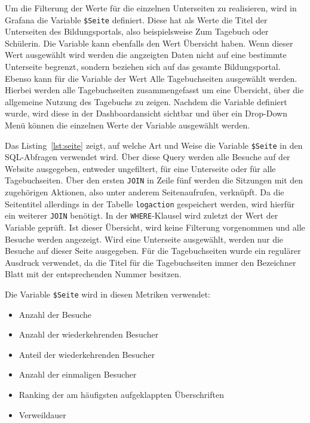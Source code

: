 Um die Filterung der Werte für die einzelnen Unterseiten zu realisieren, wird in Grafana die Variable \texttt{\$Seite} definiert. Diese hat als Werte die Titel der Unterseiten des Bildungsportals, also beispielsweise \glqq Zum Tagebuch\grqq{} oder \glqq Schülerin\grqq{}. Die Variable kann ebenfalls den Wert \glqq Übersicht\grqq{} haben. Wenn dieser Wert ausgewählt wird werden die angzeigten Daten nicht auf eine bestimmte Unterseite begrenzt, sondern beziehen sich auf das gesamte Bildungsportal. Ebenso kann für die Variable der Wert \glqq Alle Tagebuchseiten\grqq{} ausgewählt werden. Hierbei werden alle Tagebuchseiten zusammengefasst um eine Übersicht, über die allgemeine Nutzung des Tagebuchs zu zeigen. Nachdem die Variable definiert wurde, wird diese in der Dashboardansicht sichtbar und über ein Drop-Down Menü können die einzelnen Werte der Variable ausgewählt werden.

\begin{figure}[H]
    \centering
    \begin{minipage}{\textwidth}
        
    \end{minipage}
\end{figure}

Das Listing~\ref{lst:seite} zeigt, auf welche Art und Weise die Variable \texttt{\$Seite} in den SQL-Abfragen verwendet wird. Über diese Query werden alle Besuche auf der Website ausgegeben, entweder ungefiltert, für eine Unterseite oder für alle Tagebuchseiten. Über den ersten \texttt{JOIN} in Zeile fünf werden die Sitzungen mit den zugehörigen Aktionen, also unter anderem Seitenaufrufen, verknüpft. Da die Seitentitel allerdings in der Tabelle \texttt{log\textunderscore action} gespeichert werden, wird hierfür ein weiterer \texttt{JOIN} benötigt. In der {\texttt{WHERE}-Klausel} wird zuletzt der Wert der Variable geprüft. Ist dieser \glqq Übersicht\grqq{}, wird keine Filterung vorgenommen und alle Besuche werden angezeigt. Wird eine Unterseite ausgewählt, werden nur die Besuche auf dieser Seite ausgegeben. Für die Tagebuchseiten wurde ein regulärer Ausdruck verwendet, da die Titel für die Tagebuchseiten immer den Bezeichner \glqq Blatt\grqq{} mit der entsprechenden Nummer besitzen.

Die Variable \texttt{\$Seite} wird in diesen Metriken verwendet: 
\begin{itemize}
    \item Anzahl der Besuche
    \item Anzahl der wiederkehrenden Besucher
    \item Anteil der wiederkehrenden Besucher
    \item Anzahl der einmaligen Besucher
    \item Ranking der am häufigsten aufgeklappten Überschriften
    \item Verweildauer
\end{itemize}

